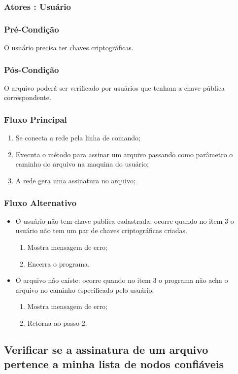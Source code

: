 \subsubsection{Atores : Usuário}
\subsubsection{Pré-Condição}
O usuário precisa ter chaves criptográficas.
\subsubsection{Pós-Condição}
O arquivo poderá ser verificado por usuários que tenham a chave pública correspondente.
\subsubsection{Fluxo Principal}
\begin{enumerate}
    \item Se conecta a rede pela linha de comando;
    \item Executa o método para assinar um arquivo passando como parâmetro o caminho do arquivo na maquina do usuário;
    \item A rede gera uma assinatura no arquivo;
\end{enumerate}
\subsubsection{Fluxo Alternativo}
\begin{itemize}
    \item O usuário não tem chave publica cadastrada: ocorre quando no item 3 o usuário não tem um par de chaves criptográficas criadas.
    \begin{enumerate}
        \item Mostra mensagem de erro;
        \item Encerra o programa.
    \end{enumerate}
     \item O arquivo não existe: ocorre quando no item 3 o programa não acha o arquivo no caminho especificado pelo usuário.
    \begin{enumerate}
        \item Mostra mensagem de erro;
        \item Retorna ao passo 2.
    \end{enumerate}
\end{itemize}

\subsection{Verificar se a assinatura de um arquivo pertence a minha lista de nodos confiáveis}
